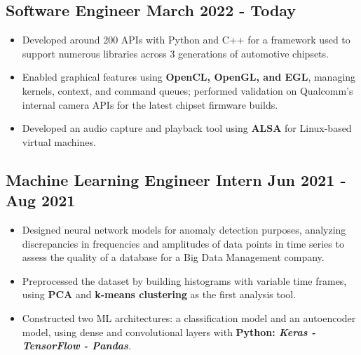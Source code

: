 \documentclass[]{article}
\begin{document}
\vspace{1ex}

\subsection{{Software Engineer  \hfill{\small{March 2022 - Today}}}}
\vspace{1.5ex}
\begin{itemize}
    \item Developed around 200 APIs with Python and C++ for a framework used to support numerous libraries across 3 generations of automotive chipsets.
    \item Enabled graphical features using \textbf{OpenCL, OpenGL, and EGL}, managing kernels, context, and command queues; performed validation on Qualcomm's internal camera APIs for the latest chipset firmware builds.
    \item Developed an audio capture and playback tool using \textbf{ALSA} for Linux-based virtual machines.
\end{itemize}

\vspace{2ex}

\subsection{Machine Learning Engineer Intern \hfill{\small{Jun 2021 - Aug 2021}}}

\vspace{1.5ex}

\begin{itemize}
    \item Designed neural network models for anomaly detection purposes, analyzing discrepancies in frequencies and amplitudes of data points in time series to assess the quality of a database for a Big Data Management company.
    \item Preprocessed the dataset by building histograms with variable time frames, using \textbf{PCA} and \textbf{k-means clustering} as the first analysis tool.
    \item Constructed two ML architectures: a classification model and an autoencoder model, using dense and convolutional layers with \textbf{Python: \textit{Keras - TensorFlow - Pandas}}.
\end{itemize}
\end{document}
